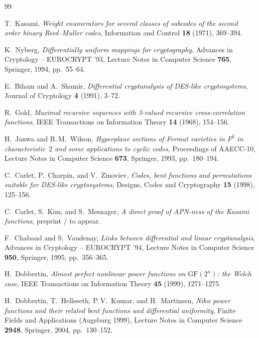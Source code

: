 \documentclass[11pt]{article}
\begin{document}
\begin{thebibliography}{99}

T.~Kasami,
\textit{Weight enumerators for several classes of subcodes of the second order binary Reed--Muller codes},
Information and Control \textbf{18} (1971), 369--394.

K.~Nyberg,
\textit{Differentially uniform mappings for cryptography},
Advances in Cryptology -- EUROCRYPT '93,
Lecture Notes in Computer Science \textbf{765}, Springer, 1994, pp.~55--64.

E.~Biham and A.~Shamir,
\textit{Differential cryptanalysis of DES-like cryptosystems},
Journal of Cryptology \textbf{4} (1991), 3--72.

R.~Gold,
\textit{Maximal recursive sequences with 3-valued recursive cross-correlation functions},
IEEE Transactions on Information Theory \textbf{14} (1968), 154--156.

H.~Janwa and R.\,M.~Wilson,
\textit{Hyperplane sections of Fermat varieties in $P^3$ in characteristic~$2$ and some applications to cyclic codes},
Proceedings of AAECC-10,
Lecture Notes in Computer Science \textbf{673}, Springer, 1993, pp.~180--194.

C.~Carlet, P.~Charpin, and V.~Zinoviev,
\textit{Codes, bent functions and permutations suitable for DES-like cryptosystems},
Designs, Codes and Cryptography \textbf{15} (1998), 125--156.

C.~Carlet, S.~Kim, and S.~Mesnager,
\textit{A direct proof of APN-ness of the Kasami functions},
preprint / to appear.

F.~Chabaud and S.~Vaudenay,
\textit{Links between differential and linear cryptanalysis},
Advances in Cryptology -- EUROCRYPT '94,
Lecture Notes in Computer Science \textbf{950}, Springer, 1995, pp.~356--365.

H.~Dobbertin,
\textit{Almost perfect nonlinear power functions on $\mathrm{GF}(2^n)$: the Welch case},
IEEE Transactions on Information Theory \textbf{45} (1999), 1271--1275.

H.~Dobbertin, T.~Helleseth, P.\,V.~Kumar, and H.~Martinsen,
\textit{Niho power functions and their related bent functions and differential uniformity},
Finite Fields and Applications (Augsburg 1999),
Lecture Notes in Computer Science \textbf{2948}, Springer, 2004, pp.~130--152.


\end{thebibliography}
\end{document}

